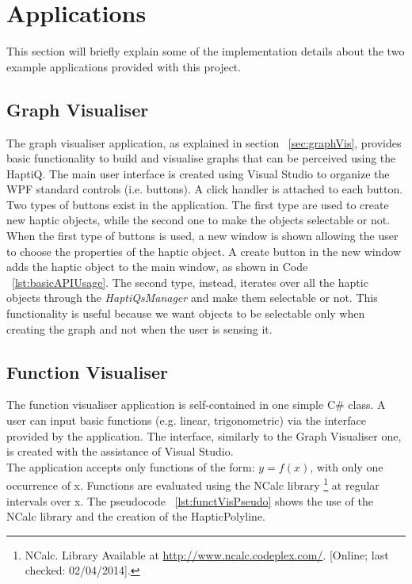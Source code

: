 \section{Applications}
\label{sec:Applications}

This section will briefly explain some of the implementation details about the two example applications provided with this project. 

\subsection{Graph Visualiser}

The graph visualiser application, as explained in section ~\ref{sec:graphVis}, provides basic functionality to build and visualise graphs that can be perceived using the HaptiQ. 
The main user interface is created using Visual Studio to organize the WPF standard controls (i.e. buttons). A click handler is attached to each button. Two types of buttons exist in the application. The first type are used to create new haptic objects, while the second one to make the objects selectable or not. \\
When the first type of buttons is used, a new window is shown allowing the user to choose the properties of the haptic object. A create button in the new window adds the haptic object to the main window, as shown in Code ~\ref{lst:basicAPIUsage}.
The second type, instead, iterates over all the haptic objects through the \textit{HaptiQsManager} and make them selectable or not. This functionality is useful because we want objects to be selectable only when creating the graph and not when the user is sensing it.  


\subsection{Function Visualiser}

The function visualiser application is self-contained in one simple C\# class. A user can input basic functions (e.g. linear, trigonometric) via the interface provided by the application. The interface, similarly to the Graph Visualiser one, is created with the assistance of Visual Studio. \\
The application accepts only functions of the form: $ y = f(x) $, with only one occurrence of x. Functions are evaluated using the NCalc library \footnote{NCalc. Library Available at \url{http://www.ncalc.codeplex.com/}. [Online; last checked: 02/04/2014].} at regular intervals over x. The pseudocode ~\ref{lst:functVisPseudo} shows the use of the NCalc library and the creation of the HapticPolyline. 

